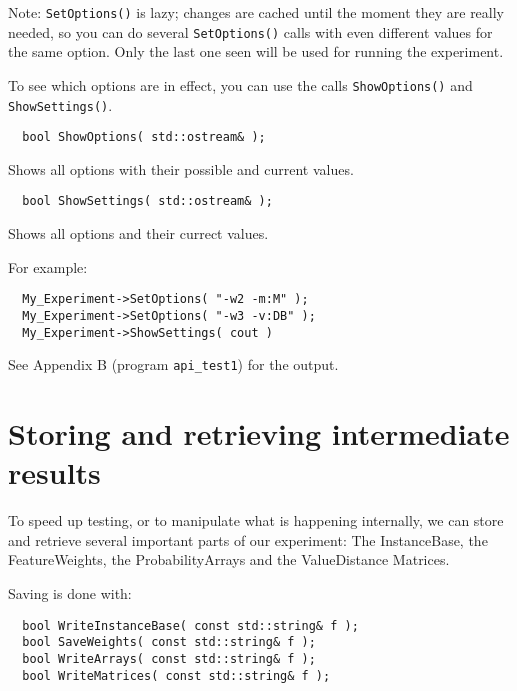 \documentclass{report}
\begin{document}
Note: {\tt SetOptions()} is lazy; changes are cached until the
moment they are really needed, so you can do several {\tt SetOptions()}
calls with even different values for the same option. Only the last
one seen will be used for running the experiment.

To see which options are in effect, you can use the calls {\tt ShowOptions()}
and {\tt ShowSettings()}.

\begin{footnotesize}
\begin{verbatim}
  bool ShowOptions( std::ostream& );
\end{verbatim}
\end{footnotesize}

Shows all options with their possible and current values.

\begin{footnotesize}
\begin{verbatim}
  bool ShowSettings( std::ostream& );
\end{verbatim}
\end{footnotesize}

Shows all options and their currect values.

For example:

\begin{footnotesize}
\begin{verbatim}
  My_Experiment->SetOptions( "-w2 -m:M" );
  My_Experiment->SetOptions( "-w3 -v:DB" );
  My_Experiment->ShowSettings( cout )
\end{verbatim}
\end{footnotesize}

See Appendix B (program {\tt api\_test1}) for the output.

\section{Storing and retrieving intermediate results}

To speed up testing, or to manipulate what is happening internally, we
can store and retrieve several important parts of our experiment: The
InstanceBase, the FeatureWeights, the ProbabilityArrays and the ValueDistance Matrices.

Saving is done with:

\begin{footnotesize}
\begin{verbatim}
  bool WriteInstanceBase( const std::string& f );
  bool SaveWeights( const std::string& f );
  bool WriteArrays( const std::string& f );
  bool WriteMatrices( const std::string& f );
\end{verbatim}
\end{footnotesize}
\end{document}
